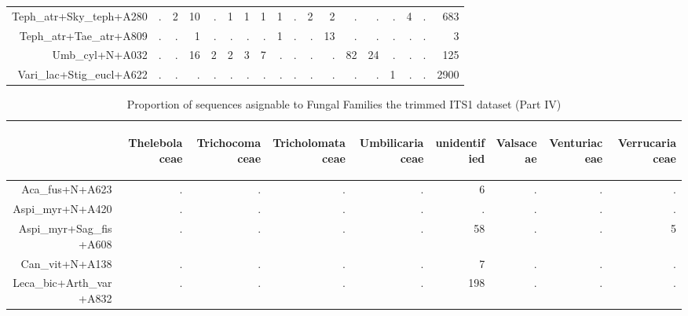 \documentclass[a4paper, 11]{article}\usepackage[]{graphicx}\usepackage[]{color}
\begin{document}
\begin{table}
\begin{tabular}{rrrrrrrrrrrrrrrrrr}
  Teph\_atr+Sky\_teph+A280 & . & 2 & 10 & . & 1 & 1 & 1 & 1 & . & 2 & 2 & . & . & . & 4 & . & 683 \\ 
  Teph\_atr+Tae\_atr+A809 & . & . & 1 & . & . & . & . & 1 & . & . & 13 & . & . & . & . & . & 3 \\ 
  Umb\_cyl+N+A032 & . & . & 16 & 2 & 2 & 3 & 7 & . & . & . & . & 82 & 24 & . & . & . & 125 \\ 
  Vari\_lac+Stig\_eucl+A622 & . & . & . & . & . & . & . & . & . & . & . & . & . & 1 & . & . & 2900 \\ 
   \hline
\end{tabular}
\end{table}
\begin{table}
\centering
\caption[Families ITS1 IV]{Proportion of sequences asignable to Fungal Families the trimmed ITS1 dataset (Part IV)} 
\begin{tabular}{rrrrrrrrr}
  \hline
 & \begin{sideways} Thelebolaceae \end{sideways} & \begin{sideways} Trichocomaceae \end{sideways} & \begin{sideways} Tricholomataceae \end{sideways} & \begin{sideways} Umbilicariaceae \end{sideways} & \begin{sideways} unidentified \end{sideways} & \begin{sideways} Valsaceae \end{sideways} & \begin{sideways} Venturiaceae \end{sideways} & \begin{sideways} Verrucariaceae \end{sideways} \\ 
  \hline
Aca\_fus+N+A623 & . & . & . & . & 6 & . & . & . \\ 
  Aspi\_myr+N+A420 & . & . & . & . & . & . & . & . \\ 
  Aspi\_myr+Sag\_fis+A608 & . & . & . & . & 58 & . & . & 5 \\ 
  Can\_vit+N+A138 & . & . & . & . & 7 & . & . & . \\ 
  Leca\_bic+Arth\_var+A832 & . & . & . & . & 198 & . & . & . \\ 

\end{tabular}
\end{table}
\end{document}
